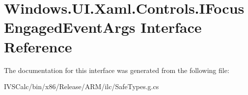 \hypertarget{interface_windows_1_1_u_i_1_1_xaml_1_1_controls_1_1_i_focus_engaged_event_args}{}\section{Windows.\+U\+I.\+Xaml.\+Controls.\+I\+Focus\+Engaged\+Event\+Args Interface Reference}
\label{interface_windows_1_1_u_i_1_1_xaml_1_1_controls_1_1_i_focus_engaged_event_args}


The documentation for this interface was generated from the following file\+:\begin{DoxyCompactItemize}
\item 
I\+V\+S\+Calc/bin/x86/\+Release/\+A\+R\+M/ilc/Safe\+Types.\+g.\+cs\end{DoxyCompactItemize}

